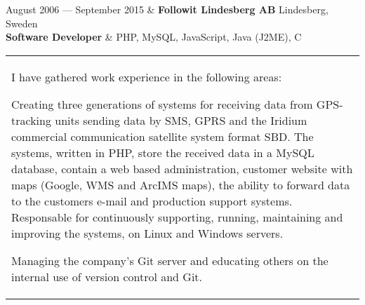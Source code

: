 \documentclass{cv-stylish}
\begin{document}
\begin{center}
\begin{JobTable}
  August 2006 --- September 2015 & \textbf{Followit Lindesberg AB}
  \hfill Lindesberg, Sweden \\[3pt]
  \hspace{5mm} \textbf{Software Developer} & \hfill PHP, MySQL,
  JavaScript, Java (J2ME), C \\
\end{JobTable}
\begin{tabularx}{0.97\linewidth}{X}
 I have gathered work experience in the following areas:
\begin{compactitem}
  \item Creating three generations of systems for receiving data from
    GPS-tracking units sending data by SMS, GPRS and the Iridium
    commercial communication satellite system format SBD.
    The systems, written in PHP, store the received data in a MySQL
    database, contain a web based administration, customer website
    with maps (Google, WMS and ArcIMS maps), the ability to forward
    data to the customers e-mail and production support
    systems. Responsable for continuously supporting, running,
    maintaining and improving the systems, on Linux and Windows
    servers.
  \item Managing the company's Git server and educating others on the
    internal use of version control and Git.
\end{compactitem}
\end{tabularx}





\end{center}
\end{document}
